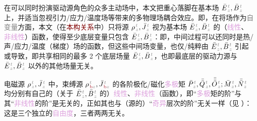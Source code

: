 在可以同时扮演\textcolor{NavyBlue}{驱动源}角色的众多\textcolor{NavyBlue}{主动}场中，本文把重心落脚在\textcolor{NavyBlue}{基本场} $\bar{E}^{\;\!\mathcolor{gray}{t}}_{\;\!\mathcolor{gray}{z}}, \bar{B}^{\;\!\mathcolor{gray}{t}}_{\;\!\mathcolor{gray}{z}}$ 上，并适当忽视引力/应力/温度场等带来的\textcolor{NavyBlue}{多物理场耦合}效应。即，在将场作为\textcolor{gray}{自变量}方面，本文（在\textcolor{Maroon}{本构关系}中）只将源 ${\rho}^{\;\!\mathcolor{gray}{t}}_{\;\!\mathcolor{gray}{z}}, \bar{J}^{\;\!\mathcolor{gray}{t}}_{\;\!\mathcolor{gray}{z}}$ 视为\textcolor{NavyBlue}{基本场} $\bar{E}^{\;\!\mathcolor{gray}{t}}_{\;\!\mathcolor{gray}{z}}, \bar{B}^{\;\!\mathcolor{gray}{t}}_{\;\!\mathcolor{gray}{z}}$ 的（\textcolor{Plum}{线性}、\textcolor{Plum}{非线性}）函数，使得至少底层变量只包含 $\bar{E}^{\;\!\mathcolor{gray}{t}}_{\;\!\mathcolor{gray}{z}}, \bar{B}^{\;\!\mathcolor{gray}{t}}_{\;\!\mathcolor{gray}{z}}$：即，中间过程可以还同时是热/声/应力/温度（梯度）场的函数，但这些中间场变量，也仅/纯粹由 $\bar{E}^{\;\!\mathcolor{gray}{t}}_{\;\!\mathcolor{gray}{z}}, \bar{B}^{\;\!\mathcolor{gray}{t}}_{\;\!\mathcolor{gray}{z}}$ 引起或导致，即共享相同的最多 2 个底层场量 $\bar{E}^{\;\!\mathcolor{gray}{t}}_{\;\!\mathcolor{gray}{z}}, \bar{B}^{\;\!\mathcolor{gray}{t}}_{\;\!\mathcolor{gray}{z}}$，也即最底层的驱动力源与 $\bar{E}^{\;\!\mathcolor{gray}{t}}_{\;\!\mathcolor{gray}{z}}, \bar{B}^{\;\!\mathcolor{gray}{t}}_{\;\!\mathcolor{gray}{z}}$ 以外的其他场量无关。

电磁源 ${\rho}^{\;\!\mathcolor{gray}{t}}_{\;\!\mathcolor{gray}{z}}, \bar{J}^{\;\!\mathcolor{gray}{t}}_{\;\!\mathcolor{gray}{z}}$ 中，束缚源 ${\rho}^{\;\!\mathcolor{gray}{t}}_{\;\!\textcolor{Maroon}{\text{b}}\mathcolor{gray}{z}}, \bar{J}^{\;\!\mathcolor{gray}{t}}_{\;\!\textcolor{Maroon}{\text{b}}\mathcolor{gray}{z}}$ 的各阶极化/磁化\textcolor{Plum}{多极}矩 $\bar{P}^{\;\!\mathcolor{gray}{t}}_{\;\!\mathcolor{gray}{z}},\bar{\bar{Q}}^{\;\!\mathcolor{gray}{t}}_{\;\!\mathcolor{gray}{z}},\bar{\bar{\bar{O}}}^{\;\!\mathcolor{gray}{t}}_{\;\!\mathcolor{gray}{z}} ; \bar{M}^{\;\!\mathcolor{gray}{t}}_{\;\!\mathcolor{gray}{z}}, \bar{\bar{N}}^{\;\!\mathcolor{gray}{t}}_{\;\!\mathcolor{gray}{z}}$ 均分别有自己的（关于 $\bar{E}^{\;\!\mathcolor{gray}{t}}_{\;\!\mathcolor{gray}{z}}, \bar{B}^{\;\!\mathcolor{gray}{t}}_{\;\!\mathcolor{gray}{z}}$ 的）\textcolor{Plum}{线性}、\textcolor{Plum}{非线性}（函数），即“\textcolor{Plum}{多极}矩的阶”与其“\textcolor{Plum}{非线性}的阶”是无关的，正如其也与（源的）“\textcolor{Plum}{奇异}层次的阶”无关一样（见 ）：这是三个独立的\textcolor{Plum}{自由度}，三者两两无关。

